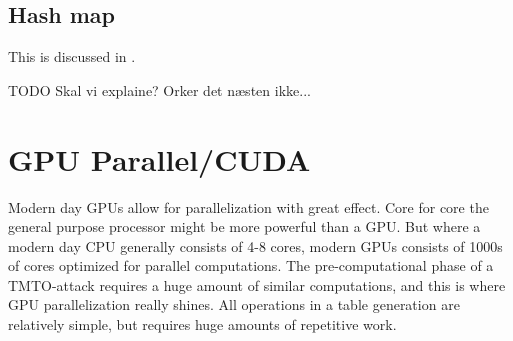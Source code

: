 \subsection{Hash map}

This is discussed in \cite[Appendix D]{176}.

TODO Skal vi explaine? Orker det næsten ikke...

\section{GPU Parallel/CUDA}

Modern day GPUs allow for parallelization with great effect. Core for
core the general purpose processor might be more powerful than a GPU.
But where a modern day CPU generally consists of 4-8 cores, modern
GPUs consists of 1000s of cores optimized for parallel
computations. The pre-computational phase of a TMTO-attack requires a
huge amount of similar computations, and this is where GPU
parallelization really shines. All operations in a table generation
are relatively simple, but requires huge amounts of repetitive work. 

